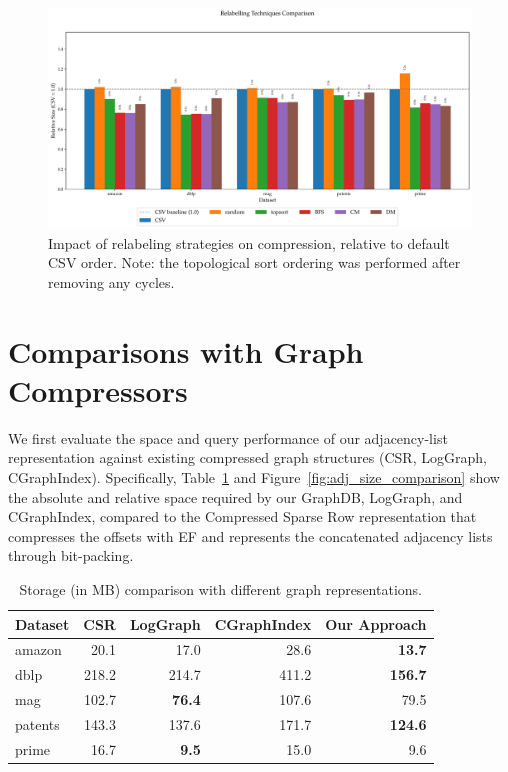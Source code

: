 \begin{figure}[htbp]
  \centering
  \includegraphics[width=\linewidth]{plots/relabelling.pdf}
  \caption{Impact of relabeling strategies on compression, relative to default CSV order. Note: the topological sort ordering was performed after removing any cycles.}
  \label{fig:relabelling_effectiveness}
\end{figure}
\FloatBarrier

\section{Comparisons with Graph Compressors}

We first evaluate the space and query performance of our adjacency-list representation against existing compressed graph structures (CSR, LogGraph, CGraphIndex). Specifically, Table~\ref{tab:space_usage} and Figure~\ref{fig:adj_size_comparison} show the absolute and relative space required by our GraphDB, LogGraph, and CGraphIndex, compared to the Compressed Sparse Row representation that compresses the offsets with EF and represents the concatenated adjacency lists through bit-packing.

\begin{table}[htbp]
  \centering
  \caption{Storage (in MB) comparison with different graph representations.}
  \label{tab:space_usage}
  \begin{tabular}{lrrrr}
    \toprule
    Dataset & CSR & LogGraph & CGraphIndex & Our Approach \\
    \midrule
    amazon  &  20.1 &  17.0 &  28.6 & \textbf{13.7} \\
    dblp    & 218.2 & 214.7 & 411.2 & \textbf{156.7} \\
    mag     & 102.7 &  \textbf{76.4} & 107.6 &  79.5 \\
    patents & 143.3 & 137.6 & 171.7 & \textbf{124.6} \\
    prime   &  16.7 &   \textbf{9.5} &  15.0 &  9.6 \\
    \bottomrule
  \end{tabular}
\end{table}
\FloatBarrier

